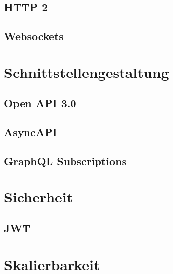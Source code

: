 \subsection{HTTP 2}
\subsection{Websockets}

\section{Schnittstellengestaltung}

\subsection{Open API 3.0}
\subsection{AsyncAPI}
\subsection{GraphQL Subscriptions}

\section{Sicherheit}
\subsection{JWT}

\section{Skalierbarkeit}
